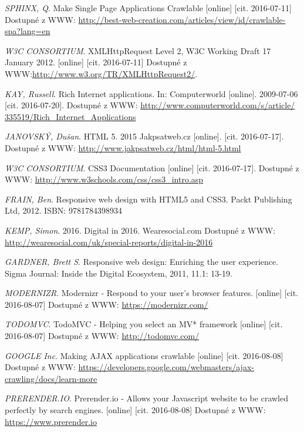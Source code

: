 \begin{thebibliography}{10}
 \textit{ SPHINX, Q}. Make Single Page Applications Crawlable [online] [cit. 2016-07-11] Dostupné z WWW: \url{http://best-web-creation.com/articles/view/id/crawlable-spa?lang=en}

 \textit{W3C CONSORTIUM}. XMLHttpRequest Level 2, W3C Working Draft 17 January 2012. [online] [cit. 2016-07-11] Dostupné z WWW:\url{http://www.w3.org/TR/XMLHttpRequest2/}.

 \textit{KAY, Russell}. Rich Internet applications. In: Computerworld [online]. 2009-07-06 [cit. 2016-07-20]. Dostupné z WWW: \url{http://www.computerworld.com/s/article/ 335519/Rich_Internet_Applications}

 \textit{JANOVSKÝ, Dušan}. HTML 5.  2015 Jakpsatweb.cz [online]. [cit. 2016-07-17]. Dostupné z WWW: \url{http://www.jakpsatweb.cz/html/html-5.html}

 \textit{W3C CONSORTIUM}. CSS3 Documentation [online] [cit. 2016-07-17]. Dostupné z WWW: \url{http://www.w3schools.com/css/css3_intro.asp}

 \textit{FRAIN, Ben}. Responsive web design with HTML5 and CSS3. Packt Publishing Ltd, 2012. ISBN: 9781784398934

 \textit{KEMP, Simon}. 2016. Digital in 2016. Wearesocial.com Dostupné z WWW: \url{http://wearesocial.com/uk/special-reports/digital-in-2016}

 \textit{GARDNER, Brett S}. Responsive web design: Enriching the user experience. Sigma Journal: Inside the Digital Ecosystem, 2011, 11.1: 13-19.

 \textit{MODERNIZR}. Modernizr - Respond to your user’s browser features. [online] [cit. 2016-08-07] Dostupné z WWW: \url{https://modernizr.com/}

 \textit{TODOMVC}. TodoMVC - Helping you select an MV* framework [online] [cit. 2016-08-07] Dostupné z WWW: \url{http://todomvc.com/}

 \textit{GOOGLE Inc}. Making AJAX applications crawlable [online] [cit. 2016-08-08] Dostupné z WWW: \url{https://developers.google.com/webmasters/ajax-crawling/docs/learn-more}

 \textit{PRERENDER.IO}. Prerender.io - Allows your Javascript website to be crawled perfectly by search engines. [online] [cit. 2016-08-08] Dostupné z WWW: \url{https://www.prerender.io}


\end{thebibliography}
